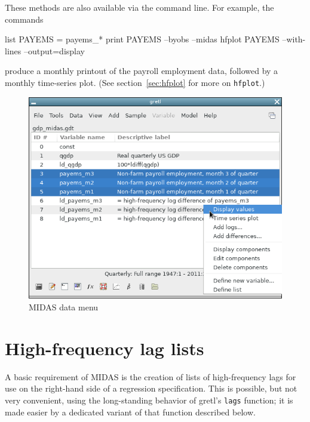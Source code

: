 These methods are also available via the command line. For example,
the commands
%
\begin{code}
list PAYEMS = payems_*
print PAYEMS --byobs --midas
hfplot PAYEMS --with-lines --output=display
\end{code}
%
produce a monthly printout of the payroll employment data, followed by
a monthly time-series plot. (See section~\ref{sec:hfplot} for more on
\texttt{hfplot}.)

\begin{figure}[htbp]
  \centering
  \includegraphics[scale=0.5]{figures/midas-list-menu}
  \caption{MIDAS data menu}
  \label{fig:data-menu}
\end{figure}


\section{High-frequency lag lists}
\label{sec:hflags}

A basic requirement of MIDAS is the creation of lists of
high-frequency lags for use on the right-hand side of a regression
specification. This is possible, but not very convenient, using the
long-standing behavior of gretl's \texttt{lags} function; it is made
easier by a dedicated variant of that function described below.

